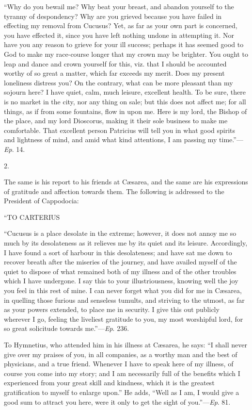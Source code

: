 ``Why do you bewail me? Why beat your breast, and abandon
yourself to the tyranny of despondency? Why are you grieved because
you have failed in effecting my removal from Cucusus? Yet,
as far as your own part is concerned, you have effected it, since you
have left nothing undone in attempting it. Nor have you any reason to
grieve for your ill success; perhaps it has seemed good to God to make
my race-course longer that my crown may be brighter. You ought to leap
and dance and crown yourself for this, viz. that I should be accounted
worthy of so great a matter, which far exceeds my merit. Does my
present loneliness distress you? On the contrary, what can be more
pleasant than my sojourn here? I have quiet, calm, much leisure,
excellent health. To be sure, there is no market in the city, nor any
thing on sale; but this does not affect me; for all things, as if from
some fountains, flow in upon me. Here is my lord, the Bishop of the
place, and my lord Dioscorus, making it their sole business to make me
comfortable. That excellent person Patricius will tell you in what
good spirits and lightness of mind, and amid what kind attentions, I
am passing my time.''—\emph{Ep}. 14.

2.

The same is his report to his friends at Cæsarea, and the same are
his expressions of gratitude and affection towards them. The following
is addressed to the President of Cappodocia:

``TO
CARTERIUS

``Cucusus is a place desolate in the extreme; however, it does
not annoy me so much by its desolateness as it relieves me by its
quiet and its leisure. Accordingly, I have found a sort of harbour in
this desolateness; and have sat me down to recover breath after the
miseries of the journey, and have availed myself of the quiet to
dispose of what remained both of my illness and of the other troubles
which I have undergone. I say this to your illustriousness, knowing
well the joy you feel in this rest of mine. I can never forget what
you did for me in Cæsarea, in quelling those furious and senseless
tumults, and striving to the utmost, as far as your powers extended,
to place me in security. I give this out publicly wherever I go,
feeling the liveliest gratitude to you, my most worshipful lord, for
so great solicitude towards me.''—\emph{Ep}. 236.

To Hymnetius, who attended him in his illness at Cæsarea, he
says: ``I shall never give over my praises of you, in all
companies, as a worthy man and the best of physicians, and a true
friend. Whenever I have to speak here of my illness, of course you
come into my story; and I am necessarily full of the benefits which I
experienced from your great skill and kindness, which it is the
greatest gratification to myself to enlarge upon.'' He adds,
``Well as I am, I would give a good sum to attract you here, were
it only to get the sight of you.''—\emph{Ep}. 81.

